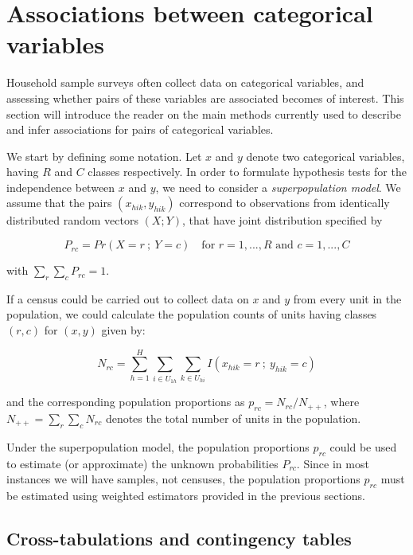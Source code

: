 \documentclass[
  12pt,
]{book}
\begin{document}
\hypertarget{associations-between-categorical-variables}{%
\chapter{Associations between categorical variables}\label{associations-between-categorical-variables}}

Household sample surveys often collect data on categorical variables, and assessing whether pairs of these variables are associated becomes of interest. This section will introduce the reader on the main methods currently used to describe and infer associations for pairs of categorical variables.

We start by defining some notation. Let \(x\) and \(y\) denote two categorical variables, having \(R\) and \(C\) classes respectively. In order to formulate hypothesis tests for the independence between \(x\) and \(y\), we need to consider a \emph{superpopulation model}. We assume that the pairs \((x_{hik} , y_{hik})\) correspond to observations from identically distributed random vectors \((X ; Y)\), that have joint distribution specified by

\[
P_{rc} = Pr \left( X = r \ ; \ Y = c \right) \quad \text{for } r=1,...,R \text{ and } c=1,...,C
\]

with \(\sum_r \sum_c P_{rc} = 1\).

If a census could be carried out to collect data on \(x\) and \(y\) from every unit in the population, we could calculate the population counts of units having classes \((r,c)\) for \((x,y)\) given by:

\[
N_{rc} = \sum_{h=1}^H \sum_{i \in U_{1h}} \sum_{k \in U_{hi}} I \left( x_{hik} = r \ ; \ y_{hik} = c \right)
\]

and the corresponding population proportions as \(p_{rc} = N_{rc} / N_{++}\), where \(N_{++} = \sum_r \sum_c N_{rc}\) denotes the total number of units in the population.

Under the superpopulation model, the population proportions \(p_{rc}\) could be used to estimate (or approximate) the unknown probabilities \(P_{rc}\). Since in most instances we will have samples, not censuses, the population proportions \(p_{rc}\) must be estimated using weighted estimators provided in the previous sections.

\hypertarget{cross-tabulations-and-contingency-tables}{%
\section{Cross-tabulations and contingency tables}\label{cross-tabulations-and-contingency-tables}}
\end{document}
